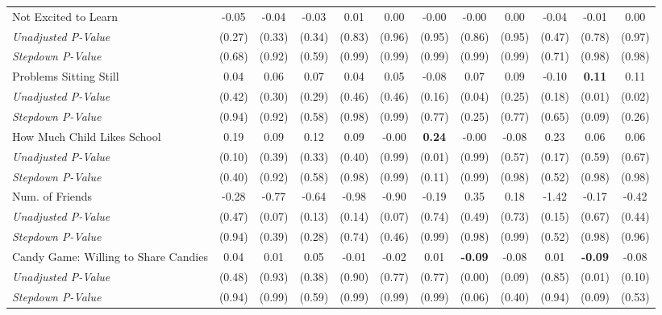 \begin{tabular}{l c c c c c c c c c c c}
Not Excited to Learn & -0.05 & -0.04 & -0.03 & 0.01 & 0.00 & -0.00 & -0.00 & 0.00 & -0.04 & -0.01 & 0.00 \\
\quad \textit{Unadjusted P-Value} & (0.27) & (0.33) & (0.34) & (0.83) & (0.96) & (0.95) & (0.86) & (0.95) & (0.47) & (0.78) & (0.97) \\
\quad \textit{Stepdown P-Value} & (0.68) & (0.92) & (0.59) & (0.99) & (0.99) & (0.99) & (0.99) & (0.99) & (0.71) & (0.98) & (0.98) \\
Problems Sitting Still & 0.04 & 0.06 & 0.07 & 0.04 & 0.05 & -0.08 & 0.07 & 0.09 & -0.10 & \textbf{ 0.11 } & 0.11 \\
\quad \textit{Unadjusted P-Value} & (0.42) & (0.30) & (0.29) & (0.46) & (0.46) & (0.16) & (0.04) & (0.25) & (0.18) & (0.01) & (0.02) \\
\quad \textit{Stepdown P-Value} & (0.94) & (0.92) & (0.58) & (0.98) & (0.99) & (0.77) & (0.25) & (0.77) & (0.65) & (0.09) & (0.26) \\
How Much Child Likes School & 0.19 & 0.09 & 0.12 & 0.09 & -0.00 & \textbf{ 0.24 } & -0.00 & -0.08 & 0.23 & 0.06 & 0.06 \\
\quad \textit{Unadjusted P-Value} & (0.10) & (0.39) & (0.33) & (0.40) & (0.99) & (0.01) & (0.99) & (0.57) & (0.17) & (0.59) & (0.67) \\
\quad \textit{Stepdown P-Value} & (0.40) & (0.92) & (0.58) & (0.98) & (0.99) & (0.11) & (0.99) & (0.98) & (0.52) & (0.98) & (0.98) \\
Num. of Friends & -0.28 & -0.77 & -0.64 & -0.98 & -0.90 & -0.19 & 0.35 & 0.18 & -1.42 & -0.17 & -0.42 \\
\quad \textit{Unadjusted P-Value} & (0.47) & (0.07) & (0.13) & (0.14) & (0.07) & (0.74) & (0.49) & (0.73) & (0.15) & (0.67) & (0.44) \\
\quad \textit{Stepdown P-Value} & (0.94) & (0.39) & (0.28) & (0.74) & (0.46) & (0.99) & (0.98) & (0.99) & (0.52) & (0.98) & (0.96) \\
Candy Game: Willing to Share Candies & 0.04 & 0.01 & 0.05 & -0.01 & -0.02 & 0.01 & \textbf{ -0.09 } & -0.08 & 0.01 & \textbf{ -0.09 } & -0.08 \\
\quad \textit{Unadjusted P-Value} & (0.48) & (0.93) & (0.38) & (0.90) & (0.77) & (0.77) & (0.00) & (0.09) & (0.85) & (0.01) & (0.10) \\
\quad \textit{Stepdown P-Value} & (0.94) & (0.99) & (0.59) & (0.99) & (0.99) & (0.99) & (0.06) & (0.40) & (0.94) & (0.09) & (0.53) \\
\bottomrule
\end{tabular}
